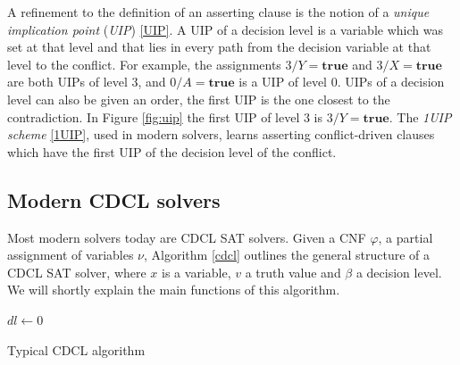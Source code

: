 \documentclass[12pt]{diicc}
\begin{document}
A refinement to the definition of an asserting clause is the notion of a \textit{unique implication point} (\textit{UIP}) \ref{UIP}. A UIP of a decision level is a variable which was set at that level and that lies in every path from the decision variable at that level to the conflict. For example, the assignments $3/Y=\textbf{true}$ and $3/X=\textbf{true}$ are both UIPs of level 3, and $0/A=\textbf{true}$ is a UIP of level 0. UIPs of a decision level can also be given an order, the first UIP is the one closest to the contradiction. In Figure \ref{fig:uip} the first UIP of level 3 is $3/Y=\textbf{true}$. The \textit{1UIP scheme} \ref{1UIP}, used in modern solvers, learns asserting conflict-driven clauses which have the first UIP of the decision level of the conflict. 

\subsection{Modern CDCL solvers}

Most modern solvers today are CDCL SAT solvers. Given a CNF $\varphi$, a partial assignment of variables $\nu$, Algorithm \ref{cdcl} outlines the general structure of a CDCL SAT solver, where $x$ is a variable, $v$ a truth value and $\beta$ a decision level. We will shortly explain the main functions of this algorithm.

\begin{algorithm}
$dl \leftarrow 0$\\
\caption{Typical CDCL algorithm\label{cdcl}}
\end{algorithm}
\end{document}
